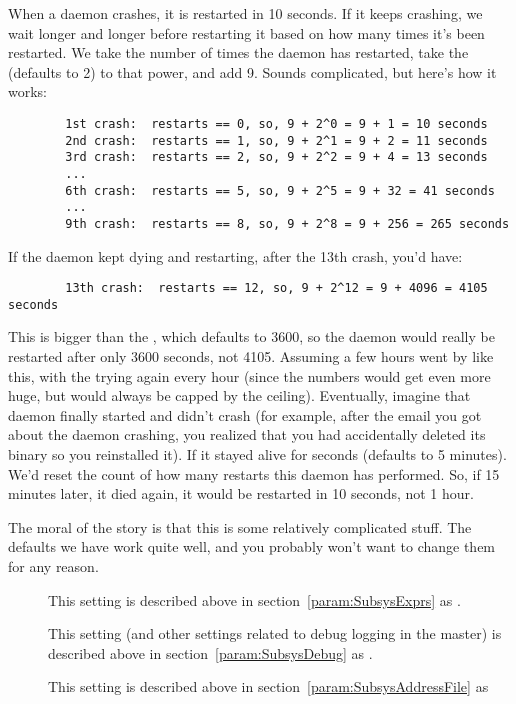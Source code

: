 When a daemon crashes, it is restarted in 10 seconds.  If it keeps
crashing, we wait longer and longer before restarting it based on how
many times it's been restarted.  We take the number of times the
daemon has restarted, take the 
(defaults to 2) to that power, and add 9.  Sounds complicated, but
here's how it works:
\begin{verbatim}
        1st crash:  restarts == 0, so, 9 + 2^0 = 9 + 1 = 10 seconds
        2nd crash:  restarts == 1, so, 9 + 2^1 = 9 + 2 = 11 seconds
        3rd crash:  restarts == 2, so, 9 + 2^2 = 9 + 4 = 13 seconds
        ...
        6th crash:  restarts == 5, so, 9 + 2^5 = 9 + 32 = 41 seconds
        ...
        9th crash:  restarts == 8, so, 9 + 2^8 = 9 + 256 = 265 seconds
\end{verbatim}

If the daemon kept dying and restarting, after the 13th crash, you'd
have:
\begin{verbatim}
        13th crash:  restarts == 12, so, 9 + 2^12 = 9 + 4096 = 4105 seconds
\end{verbatim}

This is bigger than the , which
defaults to 3600, so the daemon would really be restarted after only
3600 seconds, not 4105.  Assuming a few hours went by like this, with
the  trying again every hour (since the numbers would
get even more huge, but would always be capped by the ceiling).
Eventually, imagine that daemon finally started and didn't crash (for
example, after the email you got about the daemon crashing, you
realized that you had accidentally deleted its binary so you
reinstalled it).  If it stayed alive for
 seconds (defaults to 5 minutes).  We'd
reset the count of how many restarts this daemon has performed.  So,
if 15 minutes later, it died again, it would be restarted in 10
seconds, not 1 hour.

The moral of the story is that this is some relatively complicated
stuff.  The defaults we have work quite well, and you probably 
won't want to change them for any reason.
\begin{description}

\item[] \label{param:MasterExprs} This setting is
  described above in section~\ref{param:SubsysExprs} as
  .

\item[] \label{param:MasterDebug} This setting
  (and other settings related to debug logging in the master) is
  described above in section~\ref{param:SubsysDebug} as
  .

\item[] \label{param:MasterAddressFile}
  This setting is described above in
  section~\ref{param:SubsysAddressFile} as

\end{description}

